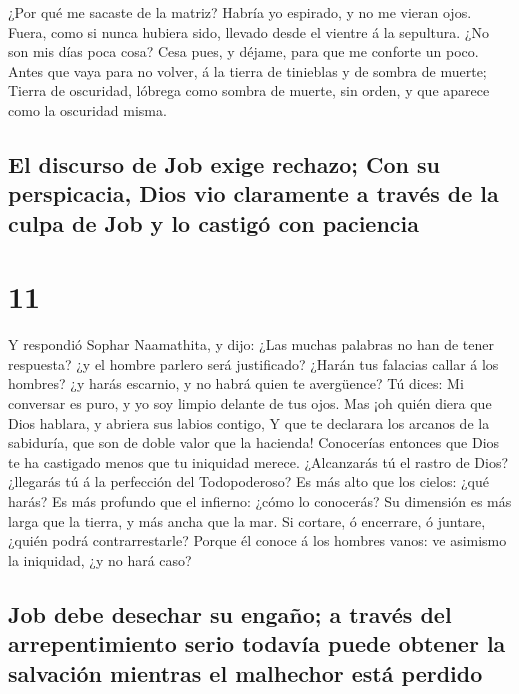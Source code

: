  ¿Por qué me sacaste de la matriz? Habría yo espirado, y no
me vieran ojos.  Fuera, como si nunca hubiera sido, llevado
desde el vientre á la sepultura.  ¿No son mis días poca
cosa? Cesa pues, y déjame, para que me conforte un poco. 
Antes que vaya para no volver, á la tierra de tinieblas y de sombra de
muerte;  Tierra de oscuridad, lóbrega como sombra de
muerte, sin orden, y que aparece como la oscuridad misma.

\hypertarget{el-discurso-de-job-exige-rechazo-con-su-perspicacia-dios-vio-claramente-a-travuxe9s-de-la-culpa-de-job-y-lo-castiguxf3-con-paciencia}{%
\subsection{El discurso de Job exige rechazo; Con su perspicacia, Dios
vio claramente a través de la culpa de Job y lo castigó con
paciencia}\label{el-discurso-de-job-exige-rechazo-con-su-perspicacia-dios-vio-claramente-a-travuxe9s-de-la-culpa-de-job-y-lo-castiguxf3-con-paciencia}}

\hypertarget{section-10}{%
\section{11}\label{section-10}}

 Y respondió Sophar Naamathita, y dijo:  ¿Las
muchas palabras no han de tener respuesta? ¿y el hombre parlero será
justificado?  ¿Harán tus falacias callar á los hombres? ¿y
harás escarnio, y no habrá quien te avergüence?  Tú dices:
Mi conversar es puro, y yo soy limpio delante de tus ojos. 
Mas ¡oh quién diera que Dios hablara, y abriera sus labios contigo,
 Y que te declarara los arcanos de la sabiduría, que son de
doble valor que la hacienda! Conocerías entonces que Dios te ha
castigado menos que tu iniquidad merece.  ¿Alcanzarás tú el
rastro de Dios? ¿llegarás tú á la perfección del Todopoderoso?
 Es más alto que los cielos: ¿qué harás? Es más profundo que
el infierno: ¿cómo lo conocerás?  Su dimensión es más larga
que la tierra, y más ancha que la mar.  Si cortare, ó
encerrare, ó juntare, ¿quién podrá contrarrestarle?  Porque
él conoce á los hombres vanos: ve asimismo la iniquidad, ¿y no hará
caso?

\hypertarget{job-debe-desechar-su-engauxf1o-a-travuxe9s-del-arrepentimiento-serio-todavuxeda-puede-obtener-la-salvaciuxf3n-mientras-el-malhechor-estuxe1-perdido}{%
\subsection{Job debe desechar su engaño; a través del arrepentimiento
serio todavía puede obtener la salvación mientras el malhechor está
perdido}\label{job-debe-desechar-su-engauxf1o-a-travuxe9s-del-arrepentimiento-serio-todavuxeda-puede-obtener-la-salvaciuxf3n-mientras-el-malhechor-estuxe1-perdido}}


